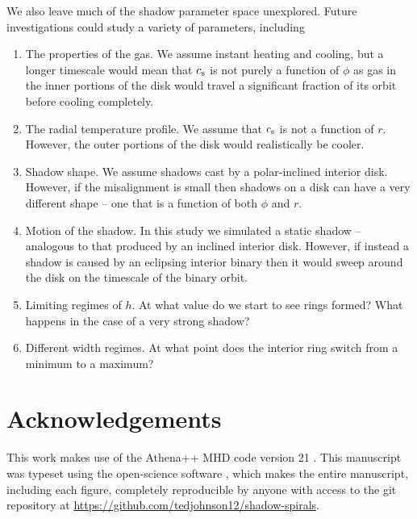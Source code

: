 \documentclass[twocolumn]{aastex631}
\begin{document}
We also leave much of the shadow parameter space unexplored. Future investigations could study a variety of parameters, including
\begin{enumerate}
    \item The properties of the gas. We assume instant heating and cooling, but a longer timescale would mean that $c_{\rm s}$ is not
        purely a function of $\phi$ as gas in the inner portions of the disk would travel a significant fraction of its orbit before cooling completely.
    \item The radial temperature profile. We assume that $c_{\rm s}$ is not a function of $r$. However, the outer portions of the disk would realistically
        be cooler.
    \item Shadow shape. We assume shadows cast by a polar-inclined interior disk. However, if the misalignment is small then shadows on a disk can have a very different
        shape -- one that is a function of both $\phi$ and $r$.
    \item Motion of the shadow. In this study we simulated a static shadow -- analogous to that produced by an inclined interior disk. However,
        if instead a shadow is caused by an eclipsing interior binary then it would sweep around the disk on the timescale of the binary orbit.
    \item Limiting regimes of $h$. At what value do we start to see rings formed? What happens in the case of a very strong shadow?
    \item Different width regimes. At what point does the interior ring switch from a minimum to a maximum?
\end{enumerate}


\section{Acknowledgements}
This work makes use of the Athena++ MHD code version 21 \citep{athena++developmentteam2021}.
This manuscript was typeset using the open-science software \showyourwork, which makes the entire manuscript, including each figure,
completely reproducible by anyone with access to the git repository at \url{https://github.com/tedjohnson12/shadow-spirals}.




\end{document}
